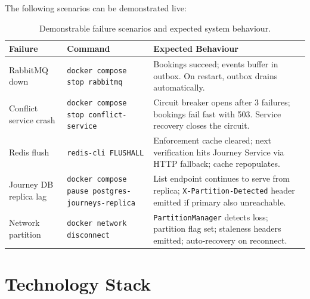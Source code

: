 \documentclass[12pt,a4paper]{article}
\begin{document}
The following scenarios can be demonstrated live:

\begin{table}[H]
\centering
\small
\begin{tabularx}{\textwidth}{L{3.5cm} L{3cm} X}
  \toprule
  \textbf{Failure} & \textbf{Command} & \textbf{Expected Behaviour} \\
  \midrule
  RabbitMQ down       & \texttt{docker compose stop rabbitmq}
    & Bookings succeed; events buffer in outbox. On restart, outbox drains automatically. \\
  \addlinespace[0.1cm]
  Conflict service crash & \texttt{docker compose stop conflict-service}
    & Circuit breaker opens after 3 failures; bookings fail fast with 503. Service recovery closes the circuit. \\
  \addlinespace[0.1cm]
  Redis flush         & \texttt{redis-cli FLUSHALL}
    & Enforcement cache cleared; next verification hits Journey Service via HTTP fallback; cache repopulates. \\
  \addlinespace[0.1cm]
  Journey DB replica lag & \texttt{docker compose pause postgres-journeys-replica}
    & List endpoint continues to serve from replica; \texttt{X-Partition-Detected} header emitted if primary also unreachable. \\
  \addlinespace[0.1cm]
  Network partition   & \texttt{docker network disconnect}
    & \texttt{PartitionManager} detects loss; partition flag set; staleness headers emitted; auto-recovery on reconnect. \\
  \bottomrule
\end{tabularx}
\caption{Demonstrable failure scenarios and expected system behaviour.}
\end{table}

\section{Technology Stack}
\end{document}
